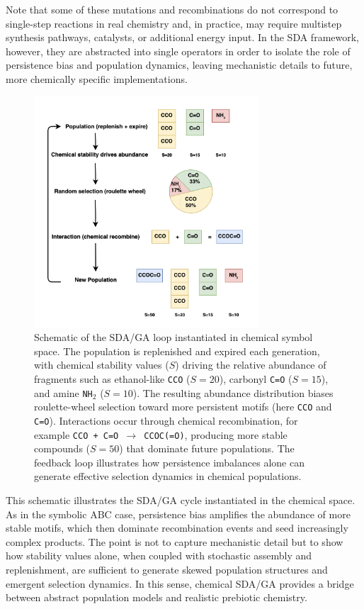 \documentclass[life,article,submit,pdftex,moreauthors]{Definitions/mdpi}
\begin{document}
Note that some of these mutations and recombinations do not correspond to single-step reactions in real chemistry and, in practice, may require multistep synthesis pathways, catalysts, or additional energy input. In the SDA framework, however, they are abstracted into single operators in order to isolate the role of persistence bias and population dynamics, leaving mechanistic details to future, more chemically specific implementations.

\begin{figure}[H]
    \centering
    \includegraphics[width=0.75\textwidth]{SDA-Chem.png}
    \caption{Schematic of the SDA/GA loop instantiated in chemical symbol space. 
    The population is replenished and expired each generation, with chemical 
    stability values ($S$) driving the relative abundance of fragments such as 
    ethanol-like \texttt{CCO} ($S=20$), carbonyl \texttt{C=O} ($S=15$), and amine 
    \texttt{NH$_2$} ($S=10$). The resulting abundance distribution biases 
    roulette-wheel selection toward more persistent motifs (here \texttt{CCO} 
    and \texttt{C=O}). Interactions occur through chemical recombination, for 
    example \texttt{CCO + C=O $\to$ CCOC(=O)}, producing more stable compounds 
    ($S=50$) that dominate future populations. The feedback loop illustrates how 
    persistence imbalances alone can generate effective selection dynamics in 
    chemical populations.}
    \label{fig:sda-chem-loop}
\end{figure}

This schematic illustrates the SDA/GA cycle instantiated in the chemical space. As in the symbolic ABC case, persistence bias amplifies the abundance of more stable motifs, which then dominate recombination events and seed increasingly complex products. The point is not to capture mechanistic detail but to show how stability values alone, when coupled with stochastic assembly and replenishment, are sufficient to generate skewed population structures and emergent selection dynamics. In this sense, chemical SDA/GA provides a bridge between abstract population models and realistic prebiotic chemistry.
\end{document}
